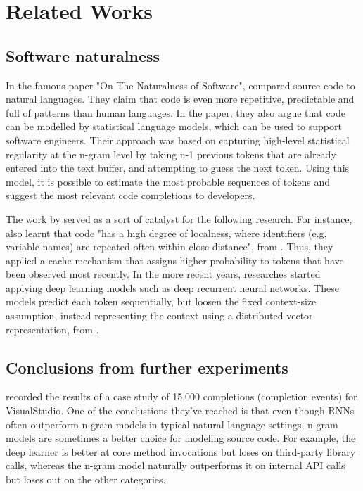 \chapter{Related Works}
\label{chap:Related Works}

\section{Software naturalness}
In the famous paper "On The Naturalness of Software", \cite{Hind12a} compared source code to natural languages. They claim that code is even more repetitive, predictable and full of patterns than human languages. In the paper, they also argue that code can be modelled by statistical language models, which can be used to support software engineers. Their approach was based on capturing high-level statistical regularity at the n-gram level by taking n-1 previous tokens that are already entered into the text buffer, and attempting to guess the next token. Using this model, it is possible to estimate the most probable sequences of tokens and suggest the most relevant code completions to developers.

The work by \cite{Hind12a} served as a sort of catalyst for the following research. For instance, \cite{Tu14a} also learnt that code "has a high degree of localness, where identifiers (e.g. variable names) are repeated often within close distance", from \cite{Alla18a}. Thus, they applied a cache mechanism that assigns higher probability to tokens that have been observed most recently. In the more recent years, researches started applying deep learning models such as deep recurrent neural networks. These models predict each token sequentially, but loosen the fixed context-size assumption, instead representing the context using a distributed vector representation, from \cite{Alla18a}.

\section{Conclusions from further experiments}
\cite{Hell19a} recorded the results of a case study of 15,000 completions (completion events) for VisualStudio. One of the conclustions they've reached is that even though RNNs often outperform n-gram models in typical natural language settings, n-gram models are sometimes a better choice for modeling source code. For example, the deep learner is better at core method invocations but loses on third-party library calls, whereas the n-gram model naturally outperforms it on internal API calls but loses out on the other categories.

